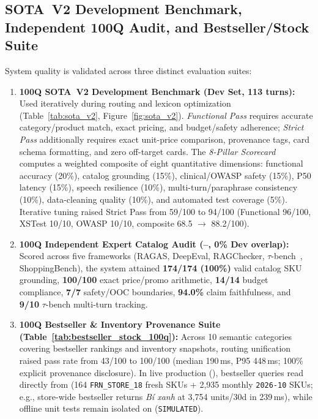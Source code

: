 \subsection*{SOTA~V2 Development Benchmark, Independent 100Q Audit, and Bestseller/Stock Suite}
System quality is validated across three distinct evaluation suites:
\begin{enumerate}
    \item \textbf{100Q SOTA~V2 Development Benchmark (Dev Set, 113 turns):} Used iteratively during routing and lexicon optimization (Table~\ref{tab:sota_v2}, Figure~\ref{fig:sota_v2}). \emph{Functional Pass} requires accurate category/product match, exact pricing, and budget/safety adherence; \emph{Strict Pass} additionally requires exact unit-price comparison, provenance tags, card schema formatting, and zero off-target cards. The \emph{8-Pillar Scorecard} computes a weighted composite of eight quantitative dimensions: functional accuracy (20\%), catalog grounding (15\%), clinical/OWASP safety (15\%), P50 latency (15\%), speech resilience (10\%), multi-turn/paraphrase consistency (10\%), data-cleaning quality (10\%), and automated test coverage (5\%). Iterative tuning raised Strict Pass from 59/100 to 94/100 (Functional 96/100, XSTest 10/10, OWASP 10/10, composite 68.5 $\to$ 88.2/100).
    \item \textbf{100Q Independent Expert Catalog Audit (--, 0\% Dev overlap):} Scored across five frameworks (RAGAS, DeepEval, RAGChecker, $\tau$-bench~\cite{yao2024taubench}, ShoppingBench), the system attained \textbf{174/174 (100\%)} valid catalog SKU grounding, \textbf{100/100} exact price/promo arithmetic, \textbf{14/14} budget compliance, \textbf{7/7} safety/OOC boundaries, \textbf{94.0\%} claim faithfulness, and \textbf{9/10} $\tau$-bench multi-turn tracking.
    \item \textbf{100Q Bestseller \& Inventory Provenance Suite (Table~\ref{tab:bestseller_stock_100q}):} Across 10 semantic categories covering bestseller rankings and inventory snapshots, routing unification raised pass rate from 43/100 to 100/100 (median 190\,ms, P95 448\,ms; 100\% explicit provenance disclosure). In live production (), bestseller queries read directly from  (164 \texttt{FRN\_STORE\_18} fresh SKUs + 2,935 monthly \texttt{2026-10} SKUs; e.g., store-wide bestseller returns \emph{Bí xanh} at 3,754 units/30d in 239\,ms), while offline unit tests remain isolated on  (\texttt{SIMULATED}).
\end{enumerate}

